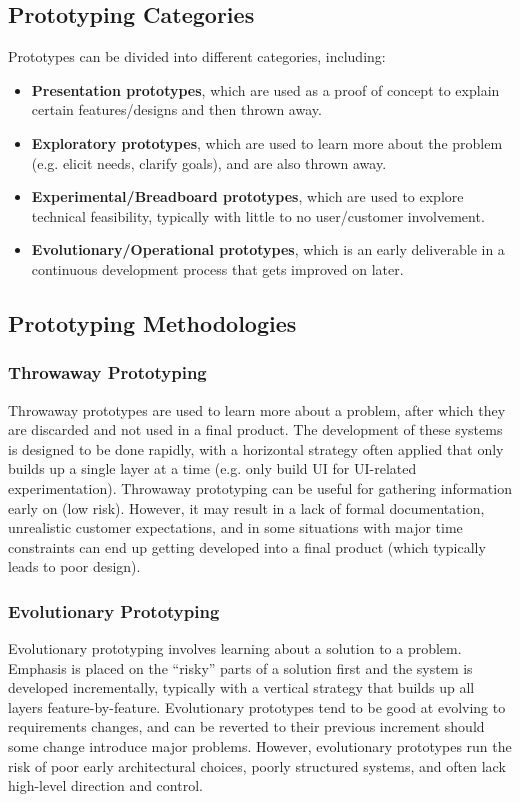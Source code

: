 \documentclass[12pt,titlepage]{article}
\begin{document}
    \subsection{Prototyping Categories}
      Prototypes can be divided into different categories, including:
      \begin{itemize}
        \item \textbf{Presentation prototypes}, which are used as a proof of concept to explain certain features/designs and then thrown away.
        \item \textbf{Exploratory prototypes}, which are used to learn more about the problem (e.g. elicit needs, clarify goals), and are also thrown away.
        \item \textbf{Experimental/Breadboard prototypes}, which are used to explore technical feasibility, typically with little to no user/customer involvement.
        \item \textbf{Evolutionary/Operational prototypes}, which is an early deliverable in a continuous development process that gets improved on later.
      \end{itemize}

    \subsection{Prototyping Methodologies}

      \subsubsection{Throwaway Prototyping}
        Throwaway prototypes are used to learn more about a problem, after which they are discarded and not used in a final product. The development of these systems is designed to be
        done rapidly, with a horizontal strategy often applied that only builds up a single layer at a time (e.g. only build UI for UI-related experimentation). Throwaway prototyping can
        be useful for gathering information early on (low risk). However, it may result in a lack of formal documentation, unrealistic customer expectations, and in some situations with
        major time constraints can end up getting developed into a final product (which typically leads to poor design).

      \subsubsection{Evolutionary Prototyping}
        Evolutionary prototyping involves learning about a solution to a problem. Emphasis is placed on the ``risky'' parts of a solution first and the system is developed incrementally,
        typically with a vertical strategy that builds up all layers feature-by-feature. Evolutionary prototypes tend to be good at evolving to requirements changes, and can be
        reverted to their previous increment should some change introduce major problems. However, evolutionary prototypes run the risk of poor early architectural choices, poorly
        structured systems, and often lack high-level direction and control.
\end{document}
